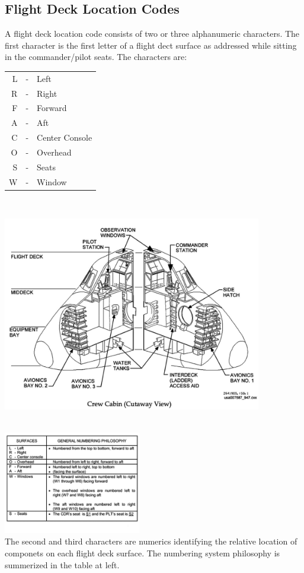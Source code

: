 \documentclass[13pt, letter,final]{article}
\begin{document}
\begin{multicols}{2}
\begin{center}
\subsection*{Flight Deck Location Codes}
\end{center}
A flight deck location code consists of two or three alphanumeric characters. The first character is the first letter of a flight dect surface as addressed while sitting in the commander/pilot seats. The characters are:
\\
\begin{tabular}{r c l}
	L& - &Left\\
	R& - &Right\\
	F &-& Forward\\
	A &-& Aft\\
	C &- &Center Console\\
	O &-& Overhead\\
	S &-& Seats\\
	W &-& Window\\
\end{tabular}
\\
\end{multicols}
\includegraphics[width=0.85\textwidth]{Crew Cabin (Cutaway).jpg}
\begin{multicols}{2}
\\
\includegraphics[width=0.45\textwidth]{FD_Codes_Chart.jpg}
\\
The second and third characters are numerics identifying the relative location of componets on each flight deck surface. The numbering system philosophy is summerized in the table at left.
\\
\end{multicols}
\end{document}
